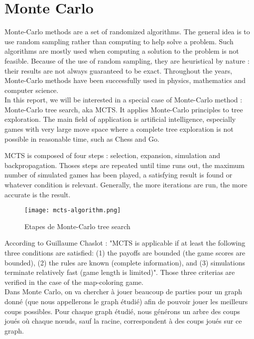 \section{Monte Carlo}

Monte-Carlo methods are a set of randomized algorithms. The general idea is to use random sampling rather than computing to help solve a problem. Such algorithms are mostly used when computing a solution to the problem is not feasible. Because of the use of random sampling, they are heuristical by nature : their results are not always guaranteed to be exact. Throughout the years, Monte-Carlo methods have been successfully used in physics, mathematics  and computer science.\\


In this report, we will be interested in a special case of Monte-Carlo method : Monte-Carlo tree search, aka MCTS. It applies Monte-Carlo principles to tree exploration. The main field of application is artificial intelligence, especially games with very large move space where a complete tree exploration is not possible in reasonable time, such as Chess and Go.

MCTS is composed of four steps : selection, expansion, simulation and backpropagation. Thoses steps are repeated until time runs out, the maximum number of simulated games has been played, a satisfying result is found or whatever condition is relevant. Generally, the more iterations are run, the more accurate is the result.

\begin{figure}
\centering
\texttt{[image: mcts-algorithm.png]}
\caption{Etapes de Monte-Carlo tree search}
\end{figure}

According to Guillaume Chaslot \cite{ChaPHD} : "MCTS is
applicable if at least the following three conditions are satisfied: (1) the payoffs are bounded
(the game scores are bounded), (2) the rules are known (complete information), and (3) simulations terminate relatively fast (game length is limited)". Those three criterias are verified in the case of the map-coloring game.\\

Dans Monte Carlo, on va chercher à jouer beaucoup de parties pour un graph donné (que nous appellerons le graph étudié) afin de pouvoir jouer les meilleurs coups possibles. 
Pour chaque graph étudié, nous générons un arbre des coups joués où chaque nœuds, sauf la racine, correspondent à des coups joués sur ce graph. 

